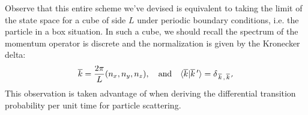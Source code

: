 \begin{rmk}
Observe that this entire scheme we've devised is equivalent to
taking the limit of the state space for a cube of side $L$ under
periodic boundary conditions, i.e. the particle in a box
situation. In such a cube, we should recall the spectrum of the
momentum operator is discrete and the normalization is given by
the Kronecker delta:
\begin{equation}%
\overline{k}=\frac{2\pi}{L}(n_x,n_y,n_z),\quad\text{and}\quad\<\overline{k}|\overline{k}\,'\>=\delta_{\,\overline{k}\, ,\,\overline{k}\,'}
\end{equation}
This observation is taken advantage of when deriving the
differential transition probability per unit time for particle
scattering.
\end{rmk}
